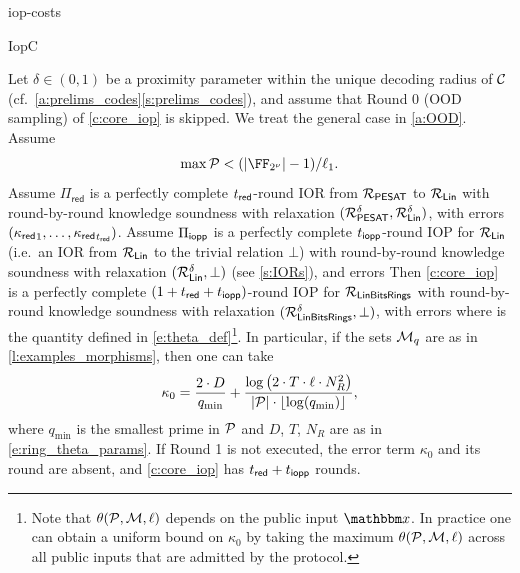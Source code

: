\begin{lncsappendix}{iop-costs}
\begin{lncsmove}{IopC}
\begin{theorem}\label{t:thm_core_IOPP} 
   Let $\delta \in (0,1)$ be a proximity parameter within the unique decoding radius of $\mathcal{C}$ (cf.\ \iflncs\cref{a:prelims_codes}\else\cref{s:prelims_codes}\fi), and assume that Round 0 (OOD sampling) of \cref{c:core_iop} is skipped. We treat the general case in \cref{a:OOD}. Assume 
   $$\max\cP < \fieldboundsizeexponent.$$ 
   Assume $\Pi_{\mathsf{red}}$ is a perfectly complete $t_{\mathsf{red}}$-round IOR from $\mathcal{R}_{\mathsf{PESAT}}$ to $\mathcal{R}_{\mathsf{Lin}}$ with round-by-round knowledge soundness  with relaxation $(\mathcal{R}_{\mathsf{PESAT}}^\delta,\mathcal{R}_{\mathsf{Lin}}^{\delta})$, with errors  $({\kappa_{\mathsf{red}}}_1, \ldots, {\kappa_{\mathsf{red}}}_{t_{\mathsf{red}}})$. Assume $\Pi_{\mathsf{iopp}}$ is a perfectly complete $t_{\mathsf{iopp}}$-round IOP  for $\mathcal{R}_{\mathsf{Lin}}$ (i.e.\ an IOR from $\mathcal{R}_{\mathsf{Lin}}$ to the trivial relation $\bot$) with round-by-round knowledge soundness with relaxation $(\mathcal{R}_{\mathsf{Lin}}^{\delta}, \bot)$ (see \cref{s:IORs}), and errors 
%
    Then \cref{c:core_iop} is a perfectly complete $(1+t_{\mathsf{red}}+t_{\mathsf{iopp}})$-round IOP for $\mathcal{R}_{\mathsf{LinBitsRings}}$ with round-by-round knowledge soundness with relaxation $(\mathcal{R}_{\mathsf{LinBitsRings}}^{\delta}, \bot)$, with errors  where  
    is the quantity defined in \eqref{e:theta_def}\footnote{Note that $\theta(\mathcal{P},\mathcal{M},\ell)$ depends on the public input $\inp$. In practice one can obtain a uniform bound on $\kappa_0$ by taking the maximum $\theta(\mathcal{P},\mathcal{M},\ell)$ across all public inputs that are admitted by the protocol.}. In particular, if the sets $\mathcal{M}_q$ are as in \cref{l:examples_morphisms}, then one can take
    $$
    \kappa_0 = \frac{2\cdot D}{q_{\min}} + \frac{\log\left(2\cdot T\cdot \ell\cdot N_R^2\right)}{|\mathcal{P}|\cdot \lfloor\log(q_{\min})\rfloor},
    $$
    where $q_{\min}$ is the smallest prime in $\mathcal{P}$ and $D$, $T$, $N_R$ are as in \eqref{e:ring_theta_params}.
    If Round 1 is not executed, the error term $\kappa_0$ and its round are absent, and \cref{c:core_iop} has $t_{\mathsf{red}}+t_{\mathsf{iopp}}$ rounds. %

\end{theorem}
\end{lncsmove}
\end{lncsappendix}
